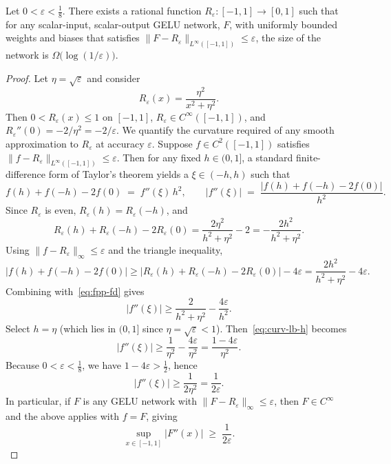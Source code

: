 \documentclass[10pt,a4paper]{amsart}
\begin{document}
\begin{theorem}
 {Let $0<\varepsilon<\tfrac{1}{8}$. There exists a rational function $R_\varepsilon:[-1,1]\to[0,1]$ such that for any scalar-input, scalar-output GELU network, $F$, with uniformly bounded weights and biases that satisfies $\|F-R_\varepsilon\|_{L^\infty([-1,1])}\le \varepsilon$, the size of the network is $\Omega\bigl(\log(1/\varepsilon)\bigr)$.}
\end{theorem}

\begin{proof}
 {Let $\eta=\sqrt{\varepsilon}$ and consider
\[
R_\varepsilon(x)=\frac{\eta^2}{x^2+\eta^2}.
\]
Then $0<R_\varepsilon(x)\le 1$ on $[-1,1]$, $R_\varepsilon\in C^\infty([-1,1])$, and $R_\varepsilon''(0)=-2/\eta^2=-2/\varepsilon$. We quantify the curvature required of any smooth approximation to $R_\varepsilon$ at accuracy $\varepsilon$. Suppose $f\in C^2([-1,1])$ satisfies $\|f-R_\varepsilon\|_{L^\infty([-1,1])}\le \varepsilon$. Then for any fixed $h\in(0,1]$, a standard finite-difference form of Taylor's theorem yields a $\xi\in(-h,h)$ such that}
\begin{equation}
f(h)+f(-h)-2f(0) \;=\; f''(\xi)\,h^2,\qquad |f''(\xi)| \;=\; \frac{|f(h)+f(-h)-2f(0)|}{h^2}.
\label{eq:fpp-fd}
\end{equation}
 {Since $R_\varepsilon$ is even, $R_\varepsilon(h)=R_\varepsilon(-h)$, and}
\[
R_\varepsilon(h)+R_\varepsilon(-h)-2R_\varepsilon(0)
=
\frac{2\eta^2}{h^2+\eta^2}-2
=
-\frac{2h^2}{h^2+\eta^2}.
\]
 {Using $\|f-R_\varepsilon\|_\infty\le \varepsilon$ and the triangle inequality,}
\[
|f(h)+f(-h)-2f(0)|
\ge |R_\varepsilon(h)+R_\varepsilon(-h)-2R_\varepsilon(0)|-4\varepsilon
=
\frac{2h^2}{h^2+\eta^2}-4\varepsilon.
\]
Combining with~\cref{eq:fpp-fd} gives
\begin{equation}
|f''(\xi)|
\ge \frac{2}{h^2+\eta^2}-\frac{4\varepsilon}{h^2}.
\label{eq:curv-lb-h}
\end{equation}
Select $h=\eta$ (which lies in $(0,1]$ since $\eta=\sqrt{\varepsilon}<1$). Then~\cref{eq:curv-lb-h} becomes
\[
|f''(\xi)|
\ge \frac{1}{\eta^2}-\frac{4\varepsilon}{\eta^2}
=
\frac{1-4\varepsilon}{\eta^2}.
\]
Because $0<\varepsilon<\tfrac18$, we have $1-4\varepsilon>\tfrac12$, hence
\[
|f''(\xi)|\ge \frac{1}{2\eta^2}=\frac{1}{2\varepsilon}.
\]
 {In particular, if $F$ is any GELU network with $\|F-R_\varepsilon\|_\infty\le \varepsilon$, then $F\in C^\infty$ and the above applies with $f=F$, giving}
\begin{equation}
\sup_{x\in[-1,1]} |F''(x)| \;\ge\; \frac{1}{2\varepsilon}.
\label{eq:need-curv}
\end{equation}


\end{proof}
\end{document}
